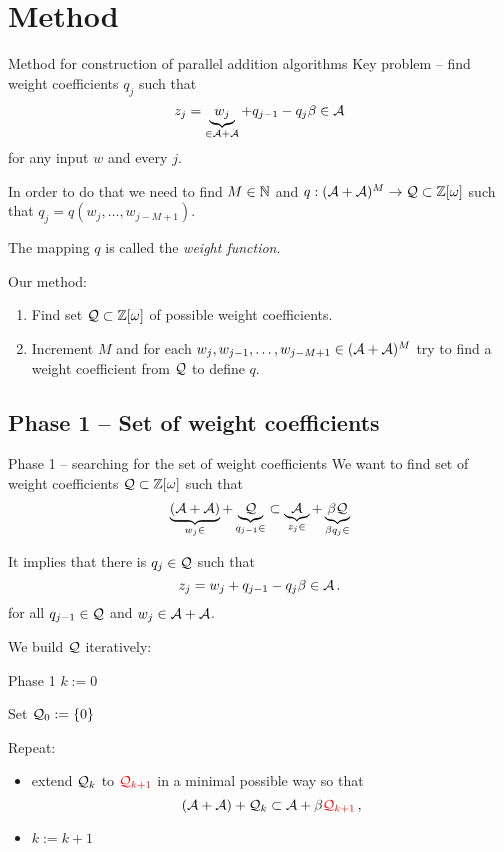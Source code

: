 \section{Method}

    {Method for construction of parallel addition algorithms}
    Key problem -- find weight coefficients $q_j$ such that 
    $$
        z_j=\underbrace{w_j}_{\in \mathcal{A} +\mathcal{A}} + q_{j-1} - q_j \beta \in \mathcal{A} 
    $$  
    for any input $w$ and every $j$.
    
    
    In order to do that we need to find $M \in \mathbb{N}$ and $q:(\mathcal{A}+\mathcal{A})^{M} \rightarrow \mathcal{Q} \subset \mathbb{Z}[\omega]$ such that $q_j=q(w_j, \dots, w_{j-M+1})$.
    
    The mapping $q$ is called the \textit{weight function}.%
    
    
    \vspace{20pt}
    Our method:
    \begin{enumerate}
        \item Find set $\mathcal{Q} \subset \mathbb{Z}[\omega]$ of possible weight coefficients.
        \item Increment $M$ and for each $w_j,w_{j-1}, \dots , w_{j-M+1} \in (\mathcal{A}+\mathcal{A})^{M}$ try to find a weight coefficient from $\mathcal{Q}$ to define $q$.
    \end{enumerate}


\subsection{Phase 1 -- Set of weight coefficients}

    {Phase 1 -- searching for the set of weight coefficients}
    We want to find set of weight coefficients $\mathcal{Q} \subset \mathbb{Z}[\omega]$ such that
    $$
    \underbrace{(\mathcal{A}+\mathcal{A})}_{w_j \in}+ \underbrace{\mathcal{Q}}_{q_{j-1} \in} \subset \underbrace{\mathcal{A}}_{z_j \in} + \underbrace{\beta \mathcal{Q}}_{\beta q_j \in}
    $$
    
    It implies that there is $q_j \in \mathcal{Q}$ such that
    $$
    z_j=w_j + q_{j-1} - q_j \beta \in \mathcal{A} \,.
    $$
    for all $q_{j-1} \in \mathcal{Q}$ and $w_j \in \mathcal{A}+\mathcal{A}$.




    We build $\mathcal{Q}$ iteratively:
    
    
    {Phase 1}
     $k:=0$
     
      Set $\mathcal{Q}_0:=\{0\}$
      
      
      Repeat:
      \begin{itemize}
          \item extend $\mathcal{Q}_k$ to $\textcolor{red}{\mathcal{Q}_{k+1}}$ in a minimal possible way so that
           $$
              (\mathcal{A}+\mathcal{A})+ \mathcal{Q}_k \subset \mathcal{A} + \beta \textcolor{red}{\mathcal{Q}_{k+1}}\,,
           $$
           \item $k:=k+1$
      \end{itemize}
      
